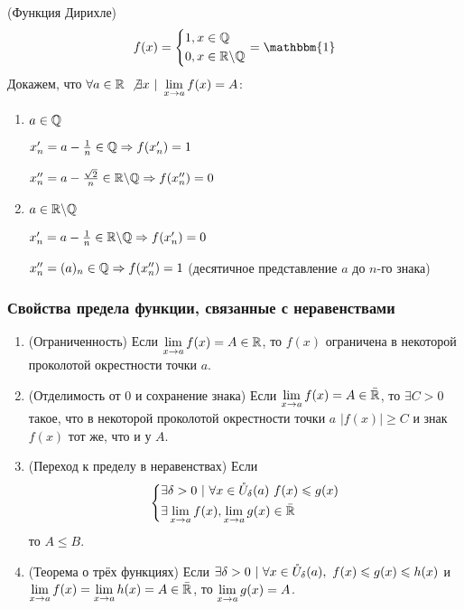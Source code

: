 \begin{example} (Функция Дирихле)
	\[
		f(x) = \System{&{1, x \in \Q} \\ &{0, x \in \R \bs \Q}} = \mathbbm{1}
	\]
	Докажем, что $\forall a \in \mathbb{R}\ \not\exists x\ |\ \lim\limits_{x \rightarrow a} f(x) = A$:
	
	\begin{enumerate}
		\item $a \in \mathbb{Q}$
		
		$x'_n = a - \frac{1}{n} \in \mathbb{Q} \Rightarrow f(x'_n) = 1$
		
		$x''_n = a - \frac{\sqrt{2}}{n} \in \mathbb{R} \backslash \mathbb{Q} \Rightarrow f(x''_n) = 0$
		
		\item $a \in \mathbb{R} \backslash \mathbb{Q}$
		
		$x'_n = a - \frac{1}{n} \in \mathbb{R} \backslash \mathbb{Q} \Rightarrow f(x'_n) = 0$
		
		$x''_n = (a)_n \in \mathbb{Q} \Rightarrow f(x''_n) = 1$ (десятичное представление $a$ до $n$-го знака)
	\end{enumerate}
\end{example}

\subsubsection*{Свойства предела функции, связанные с неравенствами}

\begin{enumerate}
	\item (Ограниченность) Если $\lim\limits_{x \rightarrow a} f(x) = A \in \mathbb{R}$, то $f(x)$ ограничена в некоторой проколотой окрестности точки $a$.
	
	\item (Отделимость от 0 и сохранение знака) Если $\lim\limits_{x \rightarrow a} f(x) = A \in \bar{\mathbb{R}}$, то $\exists C > 0$ такое, что в некоторой проколотой окрестности точки $a$ $|f(x)| \ge C$ и знак $f(x)$ тот же, что и у $A$.
	
	\item (Переход к пределу в неравенствах) Если 
	$$
	\left\{\begin{aligned}
		&{\exists \delta > 0\ |\ \forall x \in \mathring{U}_{\delta}(a)\ f(x) \leqslant g(x)}
		\\
		&{\exists \lim\limits_{x \rightarrow a} f(x), \lim\limits_{x \rightarrow a} g(x) \in \bar{\mathbb{R}}}
	\end{aligned}\right.
	$$
	то $A \le B$.
	
	\item (Теорема о трёх функциях) Если $\exists \delta > 0\ |\ \forall x \in \mathring{U}_{\delta}(a),\ f(x) \leqslant g(x) \leqslant h(x)$ и $\lim\limits_{x \rightarrow a} f(x) = \lim\limits_{x \rightarrow a} h(x) = A \in \bar{\mathbb{R}}$, то $\lim\limits_{x \rightarrow a} g(x) = A$.
\end{enumerate}

